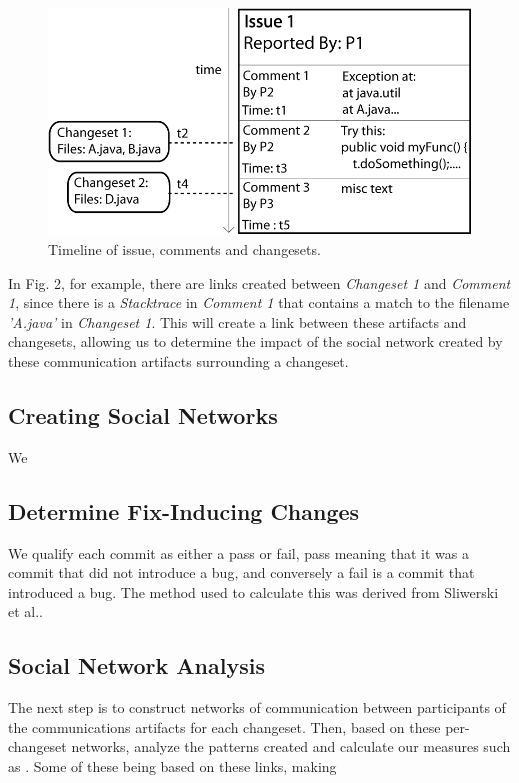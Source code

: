 \documentclass[conference]{IEEEtran}
\begin{document}
\begin{figure}[hb!]
\centering
\includegraphics[width=1.0\columnwidth]{Items}
\caption{Timeline of issue, comments and changesets.\label{fig:items}}
\end{figure}

In Fig. 2, for example, there are links created between \emph{Changeset 1} and \emph{Comment 1}, since there is a \emph{Stacktrace} in \emph{Comment 1} that contains a match to the filename \emph{'A.java'} in \emph{Changeset 1}.  This will create a link between these artifacts and changesets, allowing us to determine the impact of the social network created by these communication artifacts surrounding a changeset.

\subsection{Creating Social Networks} 
We 

\subsection{Determine Fix-Inducing Changes}
We qualify each commit as either a pass or fail, pass meaning that it was a commit that did not introduce a bug, and conversely a fail is a commit that introduced a bug.  The method used to calculate this was derived from Sliwerski et al.\cite{Sliwerski:2005:CIF:1083142.1083147}. 

\subsection{Social Network Analysis}
The next step is to construct networks of communication between participants of the communications artifacts for each changeset.  Then, based on these per-changeset networks, analyze the patterns created and calculate our measures such as .  Some of these being based on these links, making 
\end{document}
